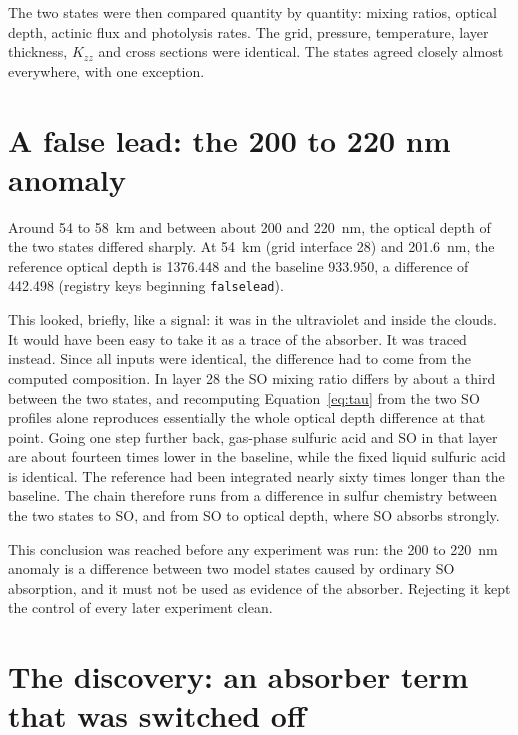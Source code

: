 The two states were then compared quantity by quantity: mixing ratios, optical depth,
actinic flux and photolysis rates. The grid, pressure, temperature, layer thickness,
$K_{zz}$ and cross sections were identical. The states agreed closely almost everywhere,
with one exception.

\section{A false lead: the 200 to 220 nm anomaly}
\label{sec:falselead}

Around 54 to 58~km and between about 200 and 220~nm, the optical depth of the two states
differed sharply. At 54~km (grid interface 28) and 201.6~nm, the
reference optical depth is 1376.448 and the baseline 933.950, a difference of 442.498
(registry keys beginning \texttt{falselead}).

This looked, briefly, like a signal: it was in the ultraviolet and inside the clouds. It
would have been easy to take it as a trace of the absorber. It was traced instead. Since
all inputs were identical, the difference had to come from the computed composition. In
layer 28 the SO mixing ratio differs by about a third between the two states, and
recomputing Equation~\eqref{eq:tau} from the two SO profiles alone reproduces
essentially the whole optical depth difference at that point. Going one step further
back, gas-phase sulfuric acid and SO in that layer are about fourteen times lower
in the baseline, while the fixed liquid sulfuric acid is identical. The reference had been integrated nearly sixty times longer than the baseline. The chain
therefore runs from a difference in sulfur chemistry between the two states to
SO, and from SO to optical depth, where SO absorbs strongly.

This conclusion was reached before any experiment was run: the 200 to 220~nm anomaly is
a difference between two model states caused by ordinary SO absorption, and it
must not be used as evidence of the absorber. Rejecting it kept the control of every
later experiment clean.

\section{The discovery: an absorber term that was switched off}
\label{sec:discovery}

